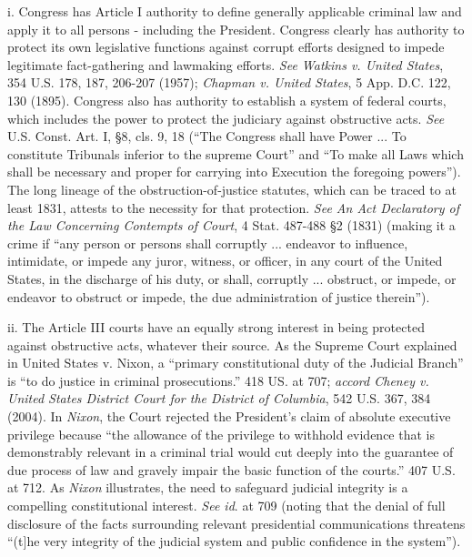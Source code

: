 i. Congress has Article I authority to define generally applicable criminal law and apply it to all persons - including the President.
Congress clearly has authority to protect its own legislative functions against corrupt efforts designed to impede legitimate fact-gathering and lawmaking efforts.
\textit{See Watkins v. United States}, 354 U.S. 178, 187, 206-207 (1957);
\textit{Chapman v. United States}, 5 App. D.C. 122, 130 (1895).
Congress also has authority to establish a system of federal courts, which includes the power to protect the judiciary against obstructive acts.
\textit{See} U.S. Const. Art. I, \S 8, cls. 9, 18 (“The Congress shall have Power ... To constitute Tribunals inferior to the supreme Court” and “To make all Laws which shall be necessary and proper for carrying into Execution the foregoing powers”).
The long lineage of the obstruction-of-justice statutes, which can be traced to at least 1831, attests to the necessity for that protection.
\textit{See An Act Declaratory of the Law Concerning Contempts of Court}, 4 Stat. 487-488 \S 2 (1831) (making it a crime if “any person or persons shall corruptly ... endeavor to influence, intimidate, or impede any juror, witness, or officer, in any court of the United States, in the discharge of his duty, or shall, corruptly ... obstruct, or impede, or endeavor to obstruct or impede, the due administration of justice therein”).

ii. The Article III courts have an equally strong interest in being protected against obstructive acts, whatever their source.
As the Supreme Court explained in United States v. Nixon, a “primary constitutional duty of the Judicial Branch” is “to do justice in criminal prosecutions.” 418 US. at 707;
\textit{accord Cheney v. United States District Court for the District of Columbia}, 542 U.S. 367, 384 (2004).
In \textit{Nixon}, the Court rejected the President’s claim of absolute executive privilege because “the allowance of the privilege to withhold evidence that is demonstrably relevant in a criminal trial would cut deeply into the guarantee of due process of law and gravely impair the basic function of the courts.” 407 U.S. at 712.
As \textit{Nixon} illustrates, the need to safeguard judicial integrity is a compelling constitutional interest.
\textit{See id}. at 709 (noting that the denial of full disclosure of the facts surrounding relevant presidential communications threatens “(t]he very integrity of the judicial system and public confidence in the system”).

